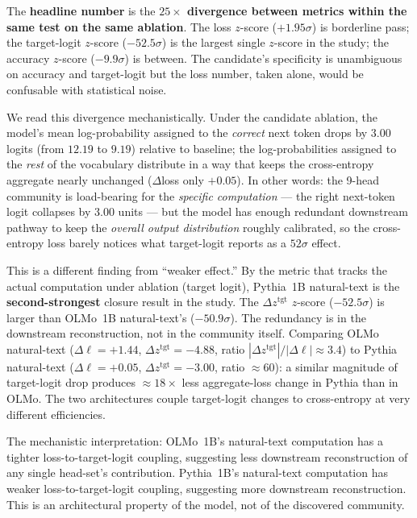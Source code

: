 \documentclass[11pt]{article}
\begin{document}
The \textbf{headline number} is the \textbf{$25\times$ divergence between
metrics within the same test on the same ablation}. The loss $z$-score
($+1.95\sigma$) is borderline pass; the target-logit $z$-score
($-52.5\sigma$) is the largest single $z$-score in the study; the accuracy
$z$-score ($-9.9\sigma$) is between. The candidate's specificity is
unambiguous on accuracy and target-logit but the loss number, taken alone,
would be confusable with statistical noise.

We read this divergence mechanistically. Under the candidate ablation, the
model's mean log-probability assigned to the \emph{correct} next token
drops by $3.00$ logits (from $12.19$ to $9.19$) relative to baseline; the
log-probabilities assigned to the \emph{rest} of the vocabulary distribute
in a way that keeps the cross-entropy aggregate nearly unchanged
($\Delta$loss only $+0.05$). In other words: the 9-head community is
load-bearing for the \emph{specific computation} --- the right next-token
logit collapses by $3.00$ units --- but the model has enough redundant
downstream pathway to keep the \emph{overall output distribution} roughly
calibrated, so the cross-entropy loss barely notices what target-logit
reports as a $52\sigma$ effect.

This is a different finding from ``weaker effect.'' By the metric that
tracks the actual computation under ablation (target logit), Pythia~1B
natural-text is the \textbf{second-strongest} closure result in the study.
The $\Delta z^{\text{tgt}}$ $z$-score ($-52.5\sigma$) is larger than
OLMo~1B natural-text's ($-50.9\sigma$). The redundancy is in the
downstream reconstruction, not in the community itself. Comparing OLMo
natural-text ($\Delta\ell = +1.44$, $\Delta z^{\text{tgt}} = -4.88$,
ratio $|\Delta z^{\text{tgt}}| / |\Delta\ell| \approx 3.4$) to Pythia
natural-text ($\Delta\ell = +0.05$, $\Delta z^{\text{tgt}} = -3.00$,
ratio $\approx 60$): a similar magnitude of target-logit drop produces
$\approx 18\times$ less aggregate-loss change in Pythia than in OLMo. The
two architectures couple target-logit changes to cross-entropy at very
different efficiencies.

The mechanistic interpretation: OLMo~1B's natural-text computation has a
tighter loss-to-target-logit coupling, suggesting less downstream
reconstruction of any single head-set's contribution. Pythia~1B's
natural-text computation has weaker loss-to-target-logit coupling,
suggesting more downstream reconstruction. This is an architectural
property of the model, not of the discovered community.
\end{document}
